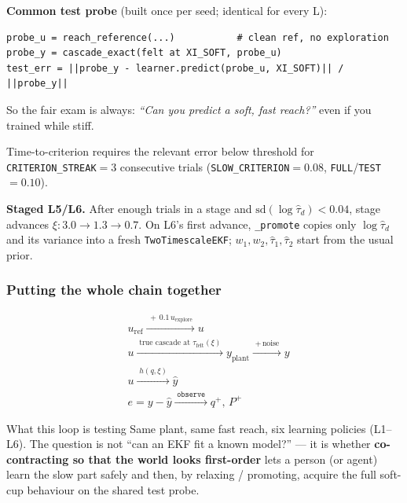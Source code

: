 \documentclass[11pt,a4paper]{article}
\begin{document}
\textbf{Common test probe} (built once per seed; identical for every L):
\begin{verbatim}
probe_u = reach_reference(...)           # clean ref, no exploration
probe_y = cascade_exact(felt at XI_SOFT, probe_u)
test_err = ||probe_y - learner.predict(probe_u, XI_SOFT)|| / ||probe_y||
\end{verbatim}
So the fair exam is always: \emph{``Can you predict a soft, fast reach?''}
even if you trained while stiff.

Time-to-criterion requires the relevant error below threshold for
\texttt{CRITERION\_STREAK}${}=3$ consecutive trials
(\texttt{SLOW\_CRITERION}${}=0.08$, \texttt{FULL}/\texttt{TEST}${}=0.10$).

\textbf{Staged L5/L6.}  After enough trials in a stage and
$\mathrm{sd}(\log\hat\tau_d)<0.04$, stage advances
$\xi:3.0\to1.3\to0.7$.  On L6's first advance, \texttt{\_promote} copies
only $\log\hat\tau_d$ and its variance into a fresh \texttt{TwoTimescaleEKF};
$w_1,w_2,\hat\tau_1,\hat\tau_2$ start from the usual prior.

\subsubsection{Putting the whole chain together}

\begin{equation}
\boxed{\;
\begin{aligned}
&u_{\mathrm{ref}}\xrightarrow{\;+\,0.1\,u_{\mathrm{explore}}\;} u \\
&u \xrightarrow{\;\text{true cascade at }\tau_{\mathrm{felt}}(\xi)\;}
  y_{\mathrm{plant}}\xrightarrow{\;+\,\text{noise}\;} y \\
&u \xrightarrow{\;h(q,\xi)\;} \hat y \\
&e=y-\hat y \xrightarrow{\;\texttt{observe}\;} q^+,\,P^+
\end{aligned}
\;}
\label{eq:l4pipeline}
\end{equation}

\begin{resultbox}{What this loop is testing}
Same plant, same fast reach, six learning policies (L1--L6).  The question is
not ``can an EKF fit a known model?'' --- it is whether \textbf{co-contracting
so that the world looks first-order} lets a person (or agent) learn the slow
part safely and then, by relaxing / promoting, acquire the full soft-cup
behaviour on the shared test probe.
\end{resultbox}
\end{document}
